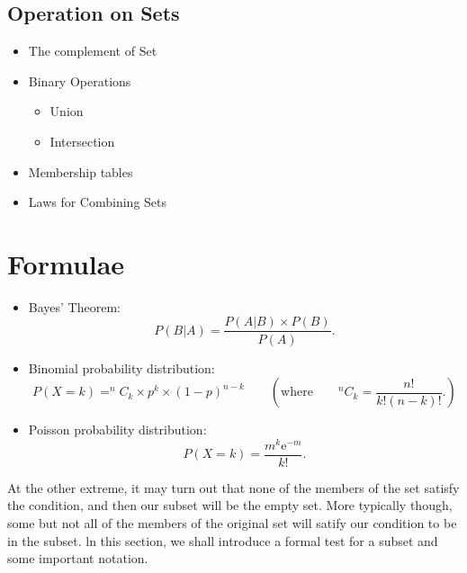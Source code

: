 {{\subsection*{Operation on Sets}

\begin{itemize}
\item The complement of Set
\item Binary Operations
\begin{itemize}
\item Union
\item Intersection
\end{itemize}
\item Membership tables
\item Laws for Combining Sets
\end{itemize}


\newpage
\section*{Formulae}
\begin{itemize}




\item Bayes' Theorem:
\begin{equation*}
P(B|A)=\frac{P\left(A|B\right) \times P(B) }{P\left( A\right) }.
\end{equation*}



\item Binomial probability distribution:
\begin{equation*}
P(X = k) = ^{n}C_{k} \times p^{k} \times \left( 1-p\right) ^{n-k}\qquad \left( \text{where}\qquad
^{n}C_{k} =\frac{n!}{k!\left(n-k\right) !}. \right)
\end{equation*}

\item Poisson probability distribution:
\begin{equation*}
P(X = k) =\frac{m^{k}\mathrm{e}^{-m}}{k!}.
\end{equation*}
\end{itemize}

 
\smallskip 
\smallskip 
At the other extreme, it may turn out that none of the members
of the set satisfy the condition, and then our subset will be the empty set. More typically though,
some but not all of the members of the original set will satify our condition to be in the subset.
ln this section, we shall introduce a formal test for a subset and some important notation.

}}

